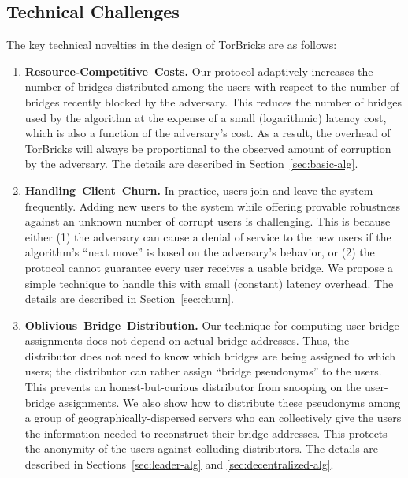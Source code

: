 \documentclass[letterpaper,twocolumn,10pt]{article}
\newcommand{\fullpaper}[1]{#1}
\newcommand{\fullpaper}[1]{}
\newcommand{\bricks}{}
\def\bricks/{\mbox{TorBricks}}
\newcommand{\sfsize}{\fontsize{0.68\baselineskip}{0.68\baselineskip}\selectfont}
\newcommand{\sans}[1]{\textbf{\textsf{\sfsize \mbox{#1}}}}
\begin{document}
\subsection{Technical Challenges} 
The key technical novelties in the design of \bricks/ are as follows:
\begin{enumerate}[leftmargin=1.7em, itemsep=0.7em, topsep=0.6em]
	\item \sans{Resource-Competitive Costs.} Our protocol adaptively increases the number of bridges distributed among the users with respect to the number of bridges recently blocked by the adversary. This reduces the number of bridges used by the algorithm at the expense of a small (logarithmic) latency cost, which is also a function of the adversary's cost. As a result, the overhead of \bricks/ will always be proportional to the observed amount of corruption by the adversary. The details are described in Section~\ref{sec:basic-alg}.  %
	
	\item \sans{Handling Client Churn.} In practice, users join and leave the system frequently. Adding new users to the system while offering provable robustness against an unknown number of corrupt users is challenging. This is because either (1) the adversary can cause a denial of service to the new users if the algorithm's ``next move'' is based on the adversary's behavior, or (2) the protocol cannot guarantee every user receives a usable bridge. We propose a simple technique to handle this with small (constant) latency overhead. The details are described in Section~\ref{sec:churn}.	
	
	\item \sans{Oblivious Bridge Distribution.} Our technique for computing user-bridge assignments does not depend on actual bridge addresses. Thus, \fullpaper{the distributor does not need to know which bridges are being assigned to which users;} the distributor can \fullpaper{rather} assign ``bridge pseudonyms'' to the users. This prevents an honest-but-curious distributor from snooping on the user-bridge assignments.
	We also show how to distribute these pseudonyms among a group of geographically-dispersed servers who can collectively give the users the information needed to reconstruct their bridge addresses. This protects the anonymity of the users against colluding distributors. The details are described in Sections~\ref{sec:leader-alg} and \ref{sec:decentralized-alg}.
	

\end{enumerate}
\end{document}
